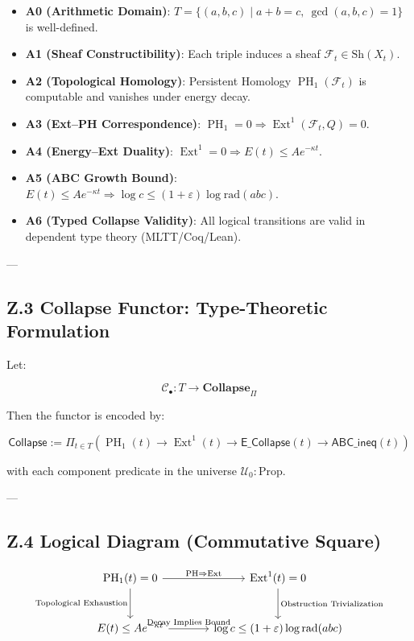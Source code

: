 \documentclass[11pt]{article}
\DeclareMathOperator{\Ext}{Ext}
\DeclareMathOperator{\PH}{PH}
\begin{document}
\begin{itemize}
  \item \textbf{A0 (Arithmetic Domain)}: \( T = \{ (a,b,c) \mid a + b = c,\ \gcd(a,b,c) = 1 \} \) is well-defined.
  \item \textbf{A1 (Sheaf Constructibility)}: Each triple induces a sheaf \( \mathcal{F}_t \in \mathrm{Sh}(X_t) \).
  \item \textbf{A2 (Topological Homology)}: Persistent Homology \( \PH_1(\mathcal{F}_t) \) is computable and vanishes under energy decay.
  \item \textbf{A3 (Ext–PH Correspondence)}: \( \PH_1 = 0 \Rightarrow \Ext^1(\mathcal{F}_t, Q) = 0 \).
  \item \textbf{A4 (Energy–Ext Duality)}: \( \Ext^1 = 0 \Rightarrow E(t) \leq Ae^{-\kappa t} \).
  \item \textbf{A5 (ABC Growth Bound)}: \( E(t) \leq Ae^{-\kappa t} \Rightarrow \log c \leq (1+\varepsilon)\log \mathrm{rad}(abc) \).
  \item \textbf{A6 (Typed Collapse Validity)}: All logical transitions are valid in dependent type theory (MLTT/Coq/Lean).
\end{itemize}

---

\subsection*{Z.3 Collapse Functor: Type-Theoretic Formulation}

Let:

\[
\mathcal{C}_\bullet : T \longrightarrow \mathbf{Collapse}_{\Pi}
\]

Then the functor is encoded by:

\[
\mathsf{Collapse} := \Pi_{t \in T} \left(
  \PH_1(t) \to \Ext^1(t) \to \mathsf{E\_Collapse}(t) \to \mathsf{ABC\_ineq}(t)
\right)
\]

with each component predicate in the universe \( \mathcal{U}_0 : \mathrm{Prop} \).

---

\subsection*{Z.4 Logical Diagram (Commutative Square)}

\[
\begin{tikzcd}[row sep=large, column sep=large]
\PH_1(t) = 0 \arrow[r, "\text{PH} \Rightarrow \Ext"] \arrow[d, swap, "\text{Topological Exhaustion}"]
& \Ext^1(t) = 0 \arrow[d, "\text{Obstruction Trivialization}"] \\
E(t) \leq Ae^{-\kappa t} \arrow[r, "\text{Decay Implies Bound}"]
& \log c \leq (1+\varepsilon)\log \mathrm{rad}(abc)
\end{tikzcd}
\]
\end{document}
